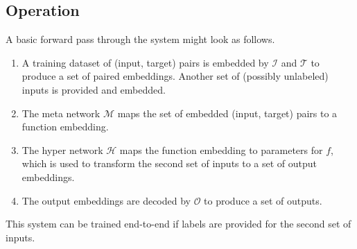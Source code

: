 \documentclass[11pt]{article}
\begin{document}
\subsection{Operation}
A basic forward pass through the system might look as follows.
\begin{enumerate}
\item A training dataset of (input, target) pairs is embedded by $\mathcal{I}$ and $\mathcal{T}$ to produce a set of paired embeddings. Another set of (possibly unlabeled) inputs is provided and embedded.
\item The meta network $\mathcal{M}$ maps the set of embedded (input, target) pairs to a function embedding.
\item The hyper network $\mathcal{H}$ maps the function embedding to parameters for $f$, which is used to transform the second set of inputs to a set of output embeddings.
\item The output embeddings are decoded by $\mathcal{O}$ to produce a set of outputs.
\end{enumerate}
This system can be trained end-to-end if labels are provided for the second set of inputs. \par
\end{document}
